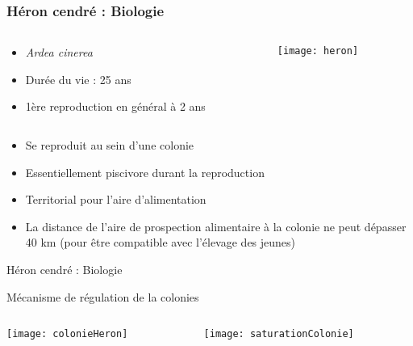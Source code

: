 \documentclass[]{beamer}
\begin{document}
\begin{frame}
  \frametitle{Héron cendré : Biologie}
    \begin{columns}
    \begin{column}[c]{0.5\textwidth}
  \begin{itemize}
    \item \textit{Ardea cinerea} 
 \item Durée du vie : 25 ans 
 \item 1ère reproduction en général à 2 ans
  \end{itemize}

     \end{column}
    \begin{column}[l]{0.5\textwidth}
    \begin{center}
       \texttt{[image: heron]} 
  \end{center}
       \end{column}
  \end{columns}
  
  
 
\begin{itemize}

 \item Se reproduit au sein d’une colonie
  \item Essentiellement piscivore durant la reproduction
 \item Territorial pour l'aire d'alimentation
 \item La distance de l’aire de prospection alimentaire à la colonie ne peut dépasser 40 km (pour être compatible avec l’élevage des jeunes)
\end{itemize}
 \end{frame}
 
%  
  \begin{frame}{Héron cendré : Biologie}
 \begin{center}
  Mécanisme de régulation de la colonies
 \end{center}
 \begin{columns}
    \begin{column}[c]{0.4\textwidth}
     \texttt{[image: colonieHeron]}    
     \end{column}
    \begin{column}[c]{0.6\textwidth}
      \texttt{[image: saturationColonie]}    
           \end{column}
  \end{columns}
%   
 \end{frame}
\end{document}
